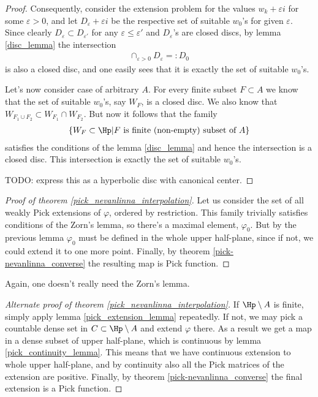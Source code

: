 \begin{proof}
	Consequently, consider the extension problem for the values $w_{k} + \varepsilon i$ for some $\varepsilon > 0$, and let $D_{\varepsilon} + \varepsilon i$ be the respective set of suitable $w_{0}$'s for given $\varepsilon$. Since clearly $D_{\varepsilon} \subset D_{\varepsilon'}$ for any $\varepsilon \leq \varepsilon'$ and $D_{\varepsilon}$'s are closed discs, by lemma \ref{disc_lemma} the intersection
	\begin{align*}
		\cap_{\varepsilon > 0} D_{\varepsilon} =: D_{0}
	\end{align*}
	is also a closed disc, and one easily sees that it is exactly the set of suitable $w_{0}$'s.

	Let's now consider case of arbitrary $A$. For every finite subset $F \subset A$ we know that the set of suitable $w_{0}$'s, say $W_{F}$, is a closed disc. We also know that $W_{F_{1} \cup F_{2}} \subset W_{F_{1}} \cap W_{F_{2}}$. But now it follows that the family
	\begin{align*}
		\{W_{F} \subset \Hp | \text{$F$ is finite (non-empty) subset of $A$} \}
	\end{align*}
	satisfies the conditions of the lemma \ref{disc_lemma} and hence the intersection is a closed disc. This intersection is exactly the set of suitable $w_{0}$'s.

	TODO: express this as a hyperbolic disc with canonical center.
\end{proof}

\begin{proof}[Proof of theorem \ref{pick_nevanlinna_interpolation}]
Let us consider the set of all weakly Pick extensions of $\varphi$, ordered by restriction. This family trivially satisfies conditions of the Zorn's lemma, so there's a maximal element, $\varphi_{0}$. But by the previous lemma $\varphi_{0}$ must be defined in the whole upper half-plane, since if not, we could extend it to one more point. Finally, by theorem \ref{pick-nevanlinna_converse} the resulting map is Pick function.
\end{proof}

Again, one doesn't really need the Zorn's lemma.

\begin{proof}[Alternate proof of theorem \ref{pick_nevanlinna_interpolation}]
	If $\Hp \setminus A$ is finite, simply apply lemma \ref{pick_extension_lemma} repeatedly. If not, we may pick a countable dense set in $C \subset \Hp \setminus A$ and extend $\varphi$ there. As a result we get a map in a dense subset of upper half-plane, which is continuous by lemma \ref{pick_continuity_lemma}. This means that we have continuous extension to whole upper half-plane, and by continuity also all the Pick matrices of the extension are positive. Finally, by theorem \ref{pick-nevanlinna_converse} the final extension is a Pick function.
\end{proof}

